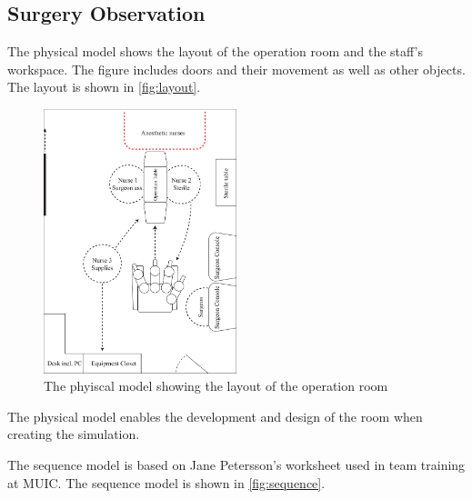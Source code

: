 \subsection*{Surgery Observation}
The physical model shows the layout of the operation room and the staff's workspace. The figure includes doors and their movement as well as other objects. The layout is shown in \autoref{fig:layout}.

\begin{figure}[hpbt]
	\centering
	\includegraphics[width=0.5\textwidth]{FieldStudies/figures/physical}
	\caption{The phyiscal model showing the layout of the operation room}
	\label{fig:layout}
\end{figure}

The physical model enables the development and design of the room when creating the simulation.

The sequence model is based on Jane Petersson's worksheet used in team training at MUIC. The sequence model is shown in \autoref{fig:sequence}.

